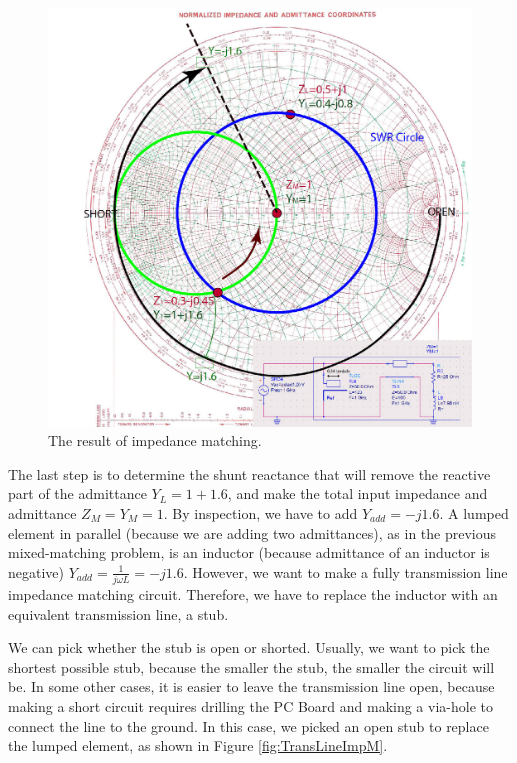 \documentclass{ximera}
\begin{document}
\begin{figure}[htbp]
\begin{center}
\includegraphics[scale=1]{../jpg/MatchTL-01.jpg}
\end{center}
\caption{The result of impedance matching.}
\label{fig:AddingSectionOfLine}
\end{figure}

The last step is to determine the shunt reactance that will remove the reactive part of the admittance $Y_L=1+1.6$, and make the total input impedance and admittance $Z_M=Y_M=1$. By inspection, we have to add $Y_{add}=-j1.6$. A lumped element in parallel (because we are adding two admittances), as in the previous mixed-matching problem, is an inductor (because admittance of an inductor is negative)  $Y_{add}=\frac{1}{j \omega L}=-j1.6$. However, we want to make a fully transmission line impedance matching circuit. Therefore, we have to replace the inductor with an equivalent transmission line, a stub. 

We can pick whether the stub is open or shorted. Usually, we want to pick the shortest possible stub, because the smaller the stub, the smaller the circuit will be. In some other cases, it is easier to leave the transmission line open, because making a short circuit requires drilling the PC Board and making a via-hole to connect the line to the ground. In this case, we picked an open stub to replace the lumped element, as shown in Figure \ref{fig:TransLineImpM}.
\end{document}

